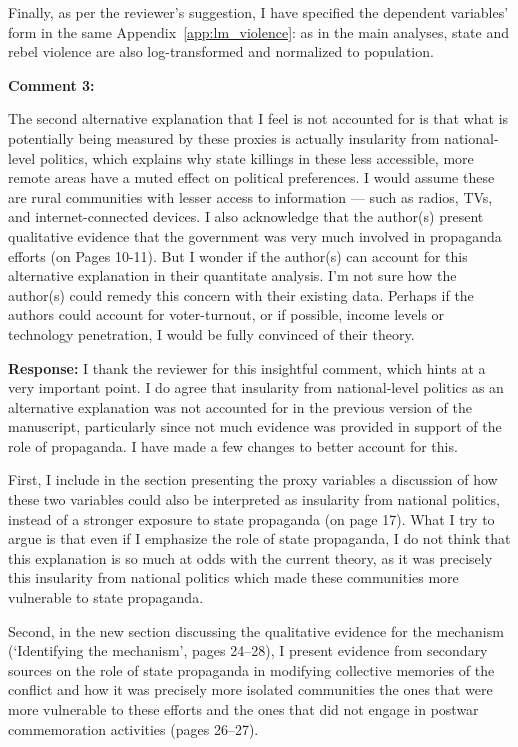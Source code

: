 \documentclass[12pt, a4paper, notitlepage]{article}
\begin{document}
Finally, as per the reviewer's suggestion, I have specified the dependent variables' form in the same Appendix~\ref{app:lm_violence}: as in the main analyses, state and rebel violence are also log-transformed and normalized to population.

\vspace{15pt}
\noindent\textbf{Comment 3:}
\begin{displayquote}
The second alternative explanation that I feel is not accounted for is that what is potentially being measured by these proxies is actually insularity from national- level politics, which explains why state killings in these less accessible, more remote areas have a muted effect on political preferences. I would assume these are rural communities with lesser access to information — such as radios, TVs, and internet-connected devices. I also acknowledge that the author(s) present qualitative evidence that the government was very much involved in propaganda efforts (on Pages 10-11). But I wonder if the author(s) can account for this alternative explanation in their quantitate analysis. I’m not sure how the author(s) could remedy this concern with their existing data. Perhaps if the authors could account for voter-turnout, or if possible, income levels or technology penetration, I would be fully convinced of their theory.
\end{displayquote}

\noindent\textbf{Response:} I thank the reviewer for this insightful comment, which hints at a very important point. I do agree that insularity from national-level politics as an alternative explanation was not accounted for in the previous version of the manuscript, particularly since not much evidence was provided in support of the role of propaganda. I have made a few changes to better account for this.

First, I include in the section presenting the proxy variables a discussion of how these two variables could also be interpreted as insularity from national politics, instead of a stronger exposure to state propaganda (on page 17). What I try to argue is that even if I emphasize the role of state propaganda, I do not think that this explanation is so much at odds with the current theory, as it was precisely this insularity from national politics which made these communities more vulnerable to state propaganda.

Second, in the new section discussing the qualitative evidence for the mechanism (`Identifying the mechanism', pages 24--28), I present evidence from secondary sources on the role of state propaganda in modifying collective memories of the conflict and how it was precisely more isolated communities the ones that were more vulnerable to these efforts and the ones that did not engage in postwar commemoration activities (pages 26--27).
\end{document}
